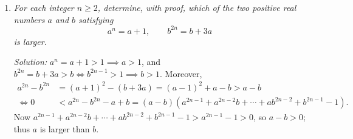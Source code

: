 \documentclass{article}
\begin{document}
\begin{enumerate}[1.]
\item %
{\itshape
For each integer $n \geq 2$, determine, with proof, which of the two positive real numbers $a$ and $b$ satisfying
\[ a^n = a+1, \qquad b^{2n} = b+3a \]
is larger.}

\textit{Solution:}
$a^n = a+1 > 1 \implies a > 1$, and $b^{2n} = b+3a > b \iff b^{2n-1} > 1 \implies b > 1$.
Moreover,
\begin{align*}
  a^{2n} -b^{2n} &= (a+1)^2 -(b+3a) = (a-1)^2 +a -b > a-b \\
  \iff 0 &< a^{2n} -b^{2n} -a +b = (a-b)(a^{2n-1} +a^{2n-2}b +\dotsb +a b^{2n-2} +b^{2n-1} -1).
\end{align*}
Now $a^{2n-1} +a^{2n-2}b +\dotsb +a b^{2n-2} +b^{2n-1} -1 > a^{2n-1} -1 > 0$, so $a-b > 0$; thus $a$ is larger than $b$.


\end{enumerate}
\end{document}
